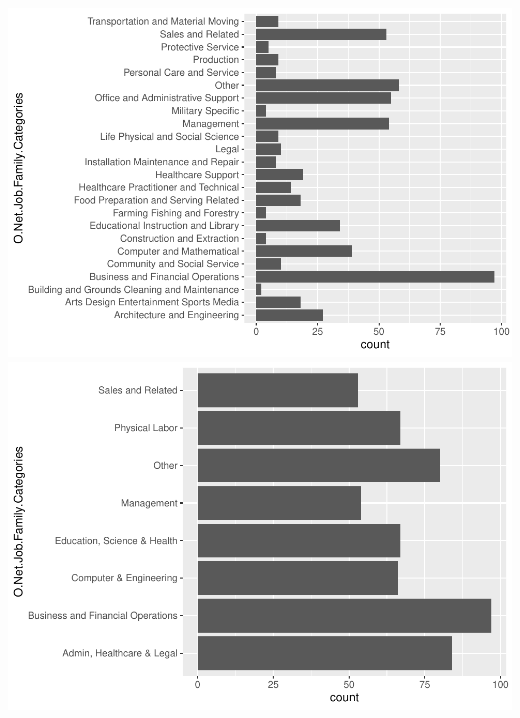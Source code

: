 \documentclass[
  man]{apa6}
\begin{document}
\includegraphics{copy-of-SIOP2023convergence_files/figure-latex/workcat-1.pdf} \includegraphics{copy-of-SIOP2023convergence_files/figure-latex/workcat-2.pdf}
\end{document}
